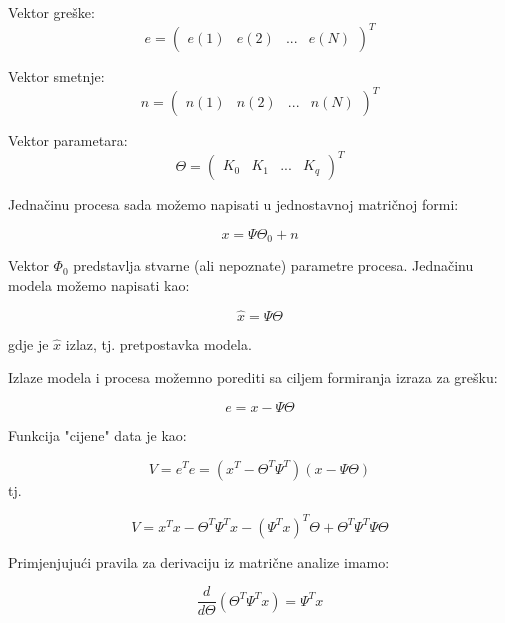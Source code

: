 Vektor greške:
\begin{equation}
    e=\begin{pmatrix}
    e(1)& e(2)& ...& e(N) 
    \end{pmatrix}^T
\end{equation}

Vektor smetnje:
\begin{equation}
    n=\begin{pmatrix}
    n(1)& n(2)& ... &n(N) 
    \end{pmatrix}^T
\end{equation}

Vektor parametara:
\begin{equation}
    \Theta=\begin{pmatrix}
    K_0 & K_1 & ...& K_q 
    \end{pmatrix}^T
\end{equation}

Jednačinu procesa sada možemo napisati u jednostavnoj matričnoj formi:

\begin{equation}
   x=\Psi \Theta_0 +n
\end{equation}

Vektor $\Phi_0$ predstavlja stvarne (ali nepoznate) parametre procesa. Jednačinu modela možemo napisati kao: 

\begin{equation}
    \hat{x}=\Psi \Theta
\end{equation}

gdje je $\hat{x}$ izlaz, tj. pretpostavka modela. 

Izlaze modela i procesa možemno porediti sa ciljem formiranja izraza za grešku:

\begin{equation}
    e=x-\Psi \Theta
\end{equation}

Funkcija "cijene" data je kao:

\begin{equation}
    V=e^Te=(x^T-\Theta ^T \Psi ^T)(x-\Psi \Theta) 
\end{equation}
 tj.
 
\begin{equation}
    V=x^Tx - \Theta ^T \Psi ^Tx - (\Psi ^T x)^T \Theta + \Theta ^T \Psi ^T \Psi \Theta
\end{equation}

Primjenjujući pravila za derivaciju iz matrične analize imamo:

\begin{equation}
    \frac{d}{d\Theta}(\Theta ^T \Psi ^T x)=\Psi ^T x
\end{equation}

